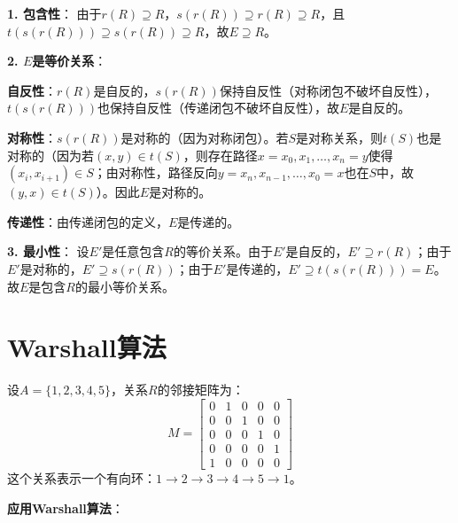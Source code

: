 \documentclass[lang=cn,11pt]{elegantbook}
\begin{document}
\textbf{1. 包含性}：
由于$r(R) \supseteq R$，$s(r(R)) \supseteq r(R) \supseteq R$，且$t(s(r(R))) \supseteq s(r(R)) \supseteq R$，故$E \supseteq R$。

\textbf{2. $E$是等价关系}：

\textbf{自反性}：$r(R)$是自反的，$s(r(R))$保持自反性（对称闭包不破坏自反性），$t(s(r(R)))$也保持自反性（传递闭包不破坏自反性），故$E$是自反的。

\textbf{对称性}：$s(r(R))$是对称的（因为对称闭包）。若$S$是对称关系，则$t(S)$也是对称的（因为若$(x,y) \in t(S)$，则存在路径$x=x_0,x_1,\ldots,x_n=y$使得$(x_i,x_{i+1}) \in S$；由对称性，路径反向$y=x_n,x_{n-1},\ldots,x_0=x$也在$S$中，故$(y,x) \in t(S)$）。因此$E$是对称的。

\textbf{传递性}：由传递闭包的定义，$E$是传递的。

\textbf{3. 最小性}：
设$E'$是任意包含$R$的等价关系。由于$E'$是自反的，$E' \supseteq r(R)$；由于$E'$是对称的，$E' \supseteq s(r(R))$；由于$E'$是传递的，$E' \supseteq t(s(r(R))) = E$。故$E$是包含$R$的最小等价关系。
\section{Warshall算法}
设$A = \{1,2,3,4,5\}$，关系$R$的邻接矩阵为：
\[
M = \begin{bmatrix}
0 & 1 & 0 & 0 & 0 \\
0 & 0 & 1 & 0 & 0 \\
0 & 0 & 0 & 1 & 0 \\
0 & 0 & 0 & 0 & 1 \\
1 & 0 & 0 & 0 & 0
\end{bmatrix}
\]
这个关系表示一个有向环：$1 \to 2 \to 3 \to 4 \to 5 \to 1$。

\textbf{应用Warshall算法}：
\end{document}
